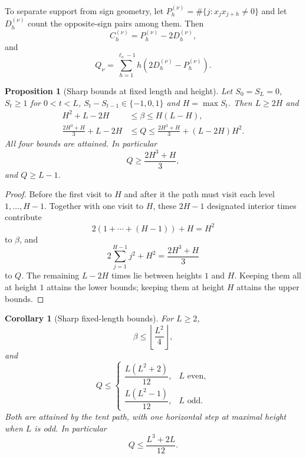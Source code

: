 \documentclass[11pt]{amsart}
\numberwithin{equation}{section}
\theoremstyle{plain}
\newtheorem{proposition}[theorem]{Proposition}
\newtheorem{corollary}[theorem]{Corollary}
\theoremstyle{definition}
\theoremstyle{remark}
\begin{document}
To separate support from sign geometry, let
$P_h^{(\nu)}=\#\{j:x_jx_{j+h}\ne0\}$ and let $D_h^{(\nu)}$ count the
opposite-sign pairs among them. Then
\begin{equation}
\label{eq:C-P-D}
C_h^{(\nu)}=P_h^{(\nu)}-2D_h^{(\nu)},
\end{equation}
and
\begin{equation}
\label{eq:Q-P-D}
Q_\nu=\sum_{h=1}^{\ell_\nu-1}h(2D_h^{(\nu)}-P_h^{(\nu)}).
\end{equation}

\begin{proposition}[Sharp bounds at fixed length and height]
\label{prop:sharp-LH}\label{rem:height-Q}
Let $S_0=S_L=0$, $S_t\ge1$ for $0<t<L$,
$S_t-S_{t-1}\in\{-1,0,1\}$ and $H=\max S_t$. Then $L\ge2H$ and
\begin{align}
H^2+L-2H&\le\beta\le H(L-H),\label{eq:beta-LH}\\
\frac{2H^3+H}{3}+L-2H&\le Q\le
\frac{2H^3+H}{3}+(L-2H)H^2.\label{eq:Q-LH}
\end{align}
All four bounds are attained. In particular
\begin{equation}
\label{eq:height_Q_min}
Q\ge\frac{2H^3+H}{3},
\end{equation}
and $Q\ge L-1$.
\end{proposition}

\begin{proof}
Before the first visit to $H$ and after it the path must visit each level
$1,\dots,H-1$.  Together with one visit to $H$, these $2H-1$ designated interior times
contribute
\[
2(1+\cdots+(H-1))+H=H^2
\]
to $\beta$, and
\[
2\sum_{j=1}^{H-1}j^2+H^2=\frac{2H^3+H}{3}
\]
to $Q$.
The remaining $L-2H$ times lie between heights $1$ and $H$. Keeping them all
at height $1$ attains the lower bounds; keeping them at height $H$ attains
the upper bounds.
\end{proof}

\begin{corollary}[Sharp fixed-length bounds]
\label{cor:fixed-L}
For $L\ge2$,
\[
\beta\le\left\lfloor\frac{L^2}{4}\right\rfloor,
\]
and
\[
Q\le
\begin{cases}
\dfrac{L(L^2+2)}{12},&L\text{ even},\\[1ex]
\dfrac{L(L^2-1)}{12},&L\text{ odd}.
\end{cases}
\]
Both are attained by the tent path, with one horizontal step at maximal height when $L$
is odd. In particular
\begin{equation}
\label{eq:Q_upper}
Q\le\frac{L^3+2L}{12}.
\end{equation}
\end{corollary}
\end{document}
